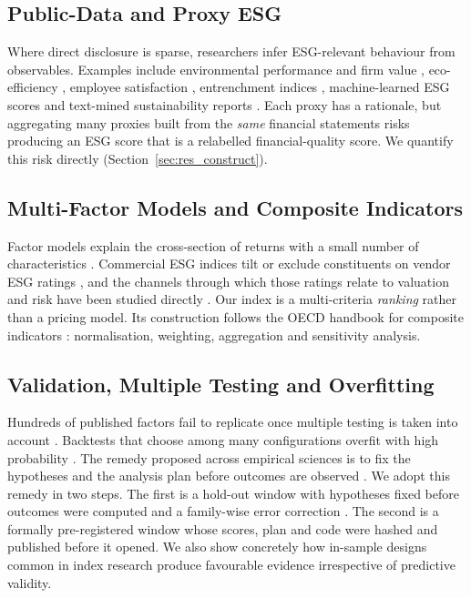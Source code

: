 \subsection{Public-Data and Proxy ESG}

Where direct disclosure is sparse, researchers infer ESG-relevant behaviour
from observables. Examples include environmental performance and firm value
\cite{konar2001does}, eco-efficiency \cite{derwall2005ecoefficiency,
guenster2011ecoefficiency}, employee satisfaction \cite{edmans_2011},
entrenchment indices \cite{bebchuk2009what}, machine-learned ESG scores
\cite{damato_2022} and text-mined sustainability reports
\cite{luccioni_2020}. Each proxy has a rationale, but aggregating many proxies
built from the \emph{same} financial statements risks producing an ESG score
that is a relabelled financial-quality score. We quantify this risk directly
(Section~\ref{sec:res_construct}).

\subsection{Multi-Factor Models and Composite Indicators}

Factor models explain the cross-section of returns with a small number of
characteristics \cite{fama_french_1993, carhart_1997, fama_french_2015,
asness_2013, jegadeesh_titman_1993}. Commercial ESG indices tilt or exclude
constituents on vendor ESG ratings \cite{msci_esg}, and the channels through
which those ratings relate to valuation and risk have been studied directly
\cite{giese_2019}. Our index is a multi-criteria \emph{ranking}
rather than a pricing model. Its construction follows the OECD handbook for
composite indicators \cite{oecd_2008}: normalisation, weighting, aggregation
and sensitivity analysis.

\subsection{Validation, Multiple Testing and Overfitting}

Hundreds of published factors fail to replicate once multiple testing is
taken into account \cite{harvey_2016}. Backtests that choose among many
configurations overfit with high probability \cite{bailey_2017}. The remedy
proposed across empirical sciences is to fix the hypotheses and the analysis
plan before outcomes are observed \cite{nosek_2018}. We adopt this remedy in
two steps. The first is a hold-out window with hypotheses fixed before
outcomes were computed and a family-wise error correction \cite{holm_1979}.
The second is a formally pre-registered window whose scores, plan and code
were hashed and published before it opened. We also show concretely how in-sample designs
common in index research produce favourable evidence irrespective of
predictive validity.
